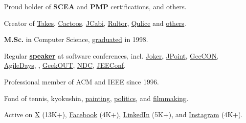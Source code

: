 \documentclass{yb}
\begin{document}
Proud holder of \textbf{\href{https://github.com/yegor256/blog/blob/master/pdf/certifications/OCMJEA-Feb11.pdf}{SCEA}} and
  \textbf{\href{https://github.com/yegor256/blog/blob/master/pdf/certifications/PMP-Jun07.pdf}{PMP}} certifications,
  and \href{https://github.com/yegor256/blog/tree/master/pdf/certifications}{others}.

Creator of \href{https://www.takes.org}{Takes},
  \href{https://www.cactoos.org}{Cactoos},
  \href{https://www.jcabi.com}{JCabi},
  \href{https://www.rultor.com}{Rultor},
  \href{https://www.qulice.com}{Qulice} and
  \href{https://www.yegor256.com/pets.html}{others}.

\textbf{M.Sc.} in Computer Science,
  \href{https://en.wikipedia.org/wiki/Oles_Honchar_Dnipro_National_University}{graduated} in 1998.

Regular \textbf{\href{https://www.yegor256.com/talks.html}{speaker}}
  at software conferences, incl.
  \href{https://youtu.be/55mwAbuDrV8}{Joker},
  \href{https://www.youtube.com/watch?v=20QBvrHq6TA}{JPoint},
  \href{https://vimeo.com/177215750}{GeeCON},
  \href{https://www.youtube.com/watch?v=TLM9eN0b6zo}{AgileDays},
  \href{https://www.youtube.com/watch?v=03PXmPc7Q3g}{},
  \href{https://www.youtube.com/watch?v=7yTIWFZrXpg}{GeekOUT},
  \href{https://www.youtube.com/watch?v=vU_x6oK437I}{NDC},
  \href{https://www.youtube.com/watch?v=GS45LzE3LPQ}{JEEConf}.

Professional member of ACM and IEEE since 1996.

Fond of
  tennis,
  kyokushin,
  \href{https://www.yegor256.com/paintings.html}{painting},
  \href{https://ru.yegor256.com}{politics},
  and
  \href{https://www.imdb.com/name/nm15660607}{filmmaking}.

Active on
  \href{https://twitter.com/intent/follow?screen_name=yegor256}{X} (13K+),
  \href{https://www.facebook.com/yegor256}{Facebook} (4K+),
  \href{https://www.linkedin.com/in/yegor256}{LinkedIn} (5K+),
  and
  \href{https://instagram.com/yegor256}{Instagram} (4K+).
\end{document}
